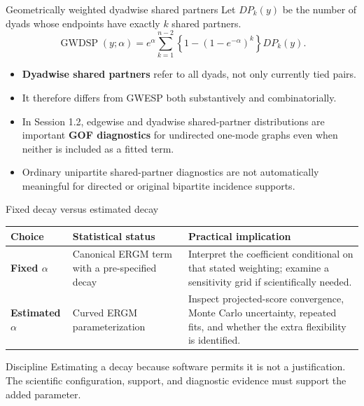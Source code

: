 \documentclass[aspectratio=169,11pt]{beamer}
\newcommand{\term}[1]{\textbf{\color{nupurple}#1}}
\begin{document}
\begin{frame}{Geometrically weighted dyadwise shared partners}
Let $DP_k(y)$ be the number of dyads whose endpoints have exactly $k$ shared partners.
\[
\operatorname{GWDSP}(y;\alpha)=e^{\alpha}\sum_{k=1}^{n-2}\left\{1-(1-e^{-\alpha})^k\right\}DP_k(y).
\]
\begin{itemize}
\item \term{Dyadwise shared partners} refer to all dyads, not only currently tied pairs.
\item It therefore differs from GWESP both substantively and combinatorially.
\item In Session 1.2, edgewise and dyadwise shared-partner distributions are important \term{GOF diagnostics} for undirected one-mode graphs even when neither is included as a fitted term.
\item Ordinary unipartite shared-partner diagnostics are not automatically meaningful for directed or original bipartite incidence supports.
\end{itemize}
\end{frame}

\begin{frame}{Fixed decay versus estimated decay}
\begin{tabularx}{\textwidth}{>{\bfseries}lX X}
\toprule
Choice & Statistical status & Practical implication\\
\midrule
Fixed $\alpha$ & Canonical ERGM term with a pre-specified decay & Interpret the coefficient conditional on that stated weighting; examine a sensitivity grid if scientifically needed.\\
Estimated $\alpha$ & Curved ERGM parameterization & Inspect projected-score convergence, Monte Carlo uncertainty, repeated fits, and whether the extra flexibility is identified.\\
\bottomrule
\end{tabularx}
\vspace{1ex}
\begin{alertblock}{Discipline}
Estimating a decay because software permits it is not a justification. The scientific configuration, support, and diagnostic evidence must support the added parameter.
\end{alertblock}
\end{frame}
\end{document}
